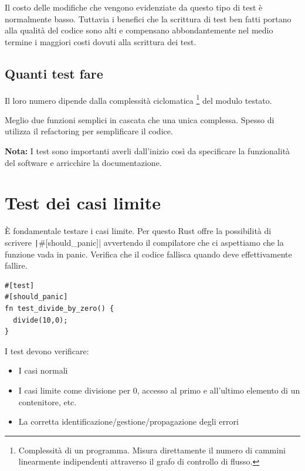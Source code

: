 Il costo delle modifiche che vengono evidenziate da questo tipo di test è
normalmente basso. Tuttavia i benefici che la scrittura di test ben fatti portano alla
qualità del codice sono alti e compensano abbondantemente nel medio termine i
maggiori costi dovuti alla scrittura dei test.

\subsection{Quanti test fare}
Il loro numero dipende dalla complessità ciclomatica \footnote{Complessità di un programma. Misura direttamente il numero di cammini linearmente indipendenti attraverso il grafo di controllo di flusso.} del modulo testato.

Meglio due funzioni semplici in cascata che una unica complessa.
Spesso di utilizza il refactoring per semplificare il codice.


\begin{tcolorbox}
  \textbf{Nota:} I test sono importanti averli dall'inizio così da specificare la funzionalità del software e arricchire la documentazione.
\end{tcolorbox}


\section{Test dei casi limite}

È fondamentale testare i casi limite. Per questo Rust offre la possibilità
di scrivere \texttt|#[should_panic]| avvertendo il compilatore che ci
aspettiamo che la funzione vada in panic. Verifica che il codice fallisca
quando deve effettivamente fallire.

\begin{verbatim}
#[test]
#[should_panic]
fn test_divide_by_zero() {
  divide(10,0);
}
\end{verbatim}

I test devono verificare:

\begin{itemize}
  \item I casi normali
  \item I casi limite come divisione per 0, accesso al primo e all'ultimo elemento di un contenitore, etc.
  \item La corretta identificazione/gestione/propagazione degli errori
\end{itemize}

